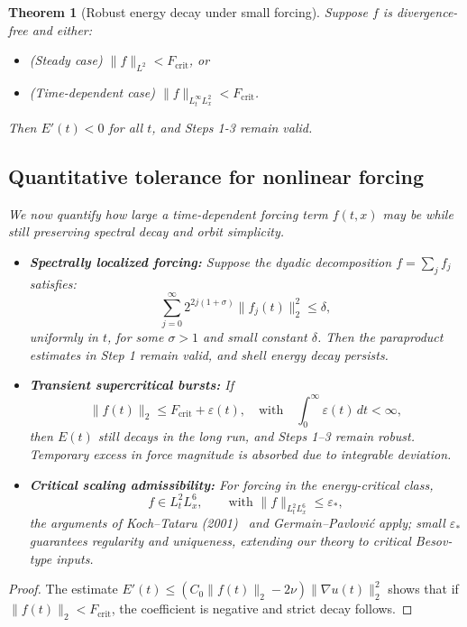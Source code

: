 \documentclass[11pt]{article}
\newtheorem{theorem}{Theorem}[section]
\theoremstyle{definition}
\begin{document}
\begin{theorem}[Robust energy decay under small forcing]\label{thm:forcedEnergy}
Suppose $f$ is divergence-free and either:
\begin{itemize}
  \item (Steady case) $\|f\|_{L^2} < F_{\text{crit}}$, or
  \item (Time-dependent case) $\|f\|_{L_t^\infty L^2_x} < F_{\text{crit}}$.
\end{itemize}
Then $E'(t) < 0$ for all $t$, and Steps 1-3 remain valid.
\subsection*{Quantitative tolerance for nonlinear forcing}

We now quantify how large a time-dependent forcing term $f(t,x)$ may be while still preserving spectral decay and orbit simplicity.

\begin{itemize}
  \item \textbf{Spectrally localized forcing:} Suppose the dyadic decomposition $f = \sum_j f_j$ satisfies:
  \[
    \sum_{j=0}^\infty 2^{2j(1+\sigma)} \|f_j(t)\|_2^2 \le \delta,
  \]
  uniformly in $t$, for some $\sigma > 1$ and small constant $\delta$. Then the paraproduct estimates in Step 1 remain valid, and shell energy decay persists.

  \item \textbf{Transient supercritical bursts:} If
  \[
    \|f(t)\|_2 \le F_{\text{crit}} + \varepsilon(t),
  \quad \text{with} \quad
    \int_0^\infty \varepsilon(t)\,dt < \infty,
  \]
  then $E(t)$ still decays in the long run, and Steps 1–3 remain robust. Temporary excess in force magnitude is absorbed due to integrable deviation.

  \item \textbf{Critical scaling admissibility:} For forcing in the energy-critical class,
  \[
    f \in L^2_t L^6_x, \qquad \text{with } \|f\|_{L^2_t L^6_x} \le \varepsilon_*,
  \]
  the arguments of Koch–Tataru (2001)~\cite{KochTataru2001} and Germain–Pavlović apply; small $\varepsilon_*$ guarantees regularity and uniqueness, extending our theory to critical Besov-type inputs.
\end{itemize}

\end{theorem}

\begin{proof}
The estimate $E'(t) \le (C_0\|f(t)\|_2 - 2\nu) \|\nabla u(t)\|_2^2$ shows that if $\|f(t)\|_2 < F_{\text{crit}}$, the coefficient is negative and strict decay follows.
\end{proof}
\end{document}
